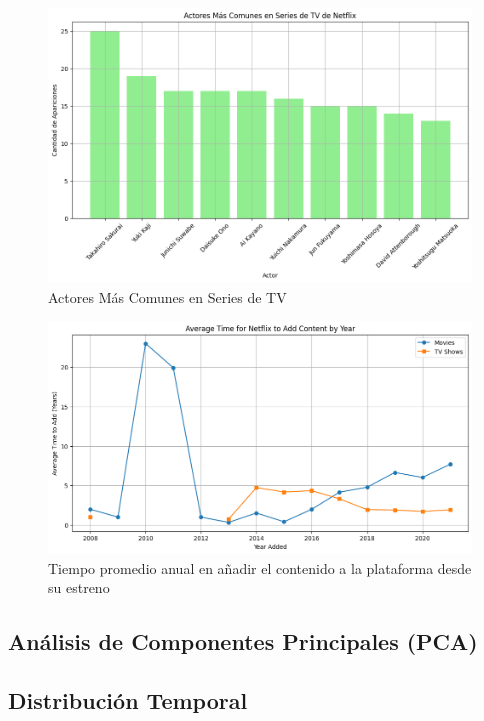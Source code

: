 \documentclass{article}
\begin{document}
\begin{figure}[H]
    \centering
    \includegraphics[width=\textwidth]{Graphs/actores_comunes_series.png}
    \caption{Actores Más Comunes en Series de TV}
    \label{fig:actores_series}
\end{figure}

\begin{figure}[H]
    \centering
    \includegraphics[width=\textwidth]{Graphs/rapidez_adicion.png}
    \caption{Tiempo promedio anual en añadir el contenido a la plataforma desde su estreno }
    \label{fig:rapidez_subida}
\end{figure}

\subsection{Análisis de Componentes Principales (PCA)}


\subsection{Distribución Temporal}
\end{document}
